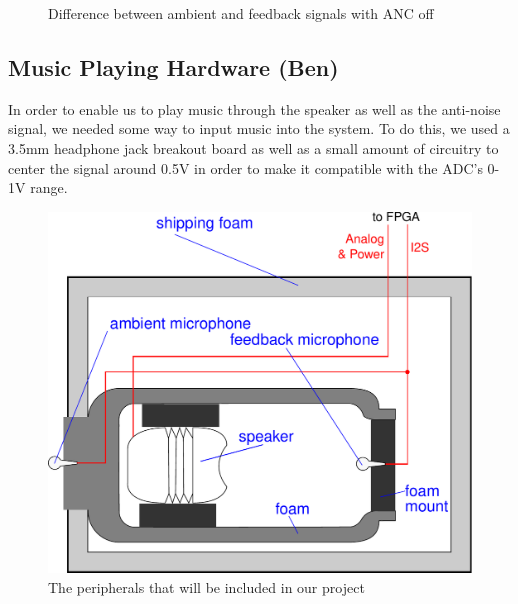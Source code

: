 \documentclass{fpgairpods}
\begin{document}

\begin{figure}
    \centering
    \caption{Difference between ambient and feedback signals with ANC off}
    \label{chart:passive_response}
\end{figure}

\subsection{Music Playing Hardware (Ben)}
In order to enable us to play music  through the speaker as well as the anti-noise signal, we needed some way to input music into the system. To do this, we used a 3.5mm headphone jack breakout board as well as a small amount of circuitry to center the signal around 0.5V in order to make it compatible with the ADC's 0-1V range.

\begin{figure}
\centering
\includegraphics[width=450pt]{./figs/system_diagram_with_text.pdf}
\caption{The peripherals that will be included in our project}
\label{fig:peripherals}
\end{figure}
\end{document}
